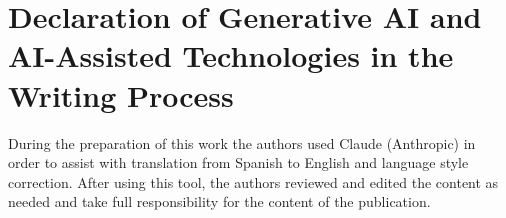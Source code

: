 \documentclass[preprint,12pt,authoryear]{elsarticle}
\begin{document}
\section*{Declaration of Generative AI and AI-Assisted Technologies in the
Writing Process}

During the preparation of this work the authors used Claude (Anthropic) in order
to assist with translation from Spanish to English and language style correction.
After using this tool, the authors reviewed and edited the content as needed and
take full responsibility for the content of the publication.



\end{document}
